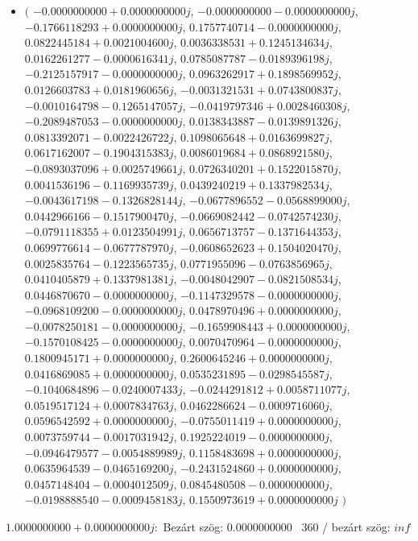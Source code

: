 \documentclass[14pt,a4paper]{article}
\begin{document}
\begin{itemize}
\item
$\big($
$-0.0000000000+0.0000000000j$, $-0.0000000000-0.0000000000j$, $-0.1766118293+0.0000000000j$, $0.1757740714-0.0000000000j$, $0.0822445184+0.0021004600j$, $0.0036338531+0.1245134634j$, $0.0162261277-0.0000616341j$, $0.0785087787-0.0189396198j$, $-0.2125157917-0.0000000000j$, $0.0963262917+0.1898569952j$, $0.0126603783+0.0181960656j$, $-0.0031321531+0.0743800837j$, $-0.0010164798-0.1265147057j$, $-0.0419797346+0.0028460308j$, $-0.2089487053-0.0000000000j$, $0.0138343887-0.0139891326j$, $0.0813392071-0.0022426722j$, $0.1098065648+0.0163699827j$, $0.0617162007-0.1904315383j$, $0.0086019684+0.0868921580j$, $-0.0893037096+0.0025749661j$, $0.0726340201+0.1522015870j$, $0.0041536196-0.1169935739j$, $0.0439240219+0.1337982534j$, $-0.0043617198-0.1326828144j$, $-0.0677896552-0.0568899000j$, $0.0442966166-0.1517900470j$, $-0.0669082442-0.0742574230j$, $-0.0791118355+0.0123504991j$, $0.0656713757-0.1371644353j$, $0.0699776614-0.0677787970j$, $-0.0608652623+0.1504020470j$, $0.0025835764-0.1223565735j$, $0.0771955096-0.0763856965j$, $0.0410405879+0.1337981381j$, $-0.0048042907-0.0821508534j$, $0.0446870670-0.0000000000j$, $-0.1147329578-0.0000000000j$, $-0.0968109200-0.0000000000j$, $0.0478970496+0.0000000000j$, $-0.0078250181-0.0000000000j$, $-0.1659908443+0.0000000000j$, $-0.1570108425-0.0000000000j$, $0.0070470964-0.0000000000j$, $0.1800945171+0.0000000000j$, $0.2600645246+0.0000000000j$, $0.0416869085+0.0000000000j$, $0.0535231895-0.0298545587j$, $-0.1040684896-0.0240007433j$, $-0.0244291812+0.0058711077j$, $0.0519517124+0.0007834763j$, $0.0462286624-0.0009716060j$, $0.0596542592+0.0000000000j$, $-0.0755011419+0.0000000000j$, $0.0073759744-0.0017031942j$, $0.1925224019-0.0000000000j$, $-0.0946479577-0.0054889989j$, $0.1158483698+0.0000000000j$, $0.0635964539-0.0465169200j$, $-0.2431524860+0.0000000000j$, $0.0457148404-0.0004012509j$, $0.0845480508-0.0000000000j$, $-0.0198888540-0.0009458183j$, $0.1550973619+0.0000000000j$
$\big)$
\end{itemize}
$1.0000000000+0.0000000000j$:\
Bezárt szög: $0.0000000000$ \
360 / bezárt szög: $inf$\
\end{document}
